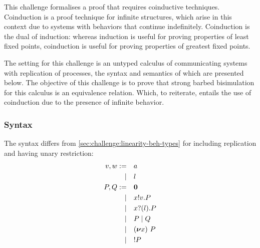 This challenge formalises a proof that requires coinductive techniques.
Coinduction is a proof technique for infinite structures, which arise in this context due to systems with behaviors that continue indefinitely.
Coinduction is the dual of induction: whereas induction is useful for proving properties of least fixed points, coinduction is useful for proving properties of greatest fixed points.

The setting for this challenge is an untyped calculus of communicating systems with replication of processes, the syntax and semantics of which are presented below.
The objective of this challenge is to prove that strong barbed bisimulation for this calculus is an equivalence relation. Which, to reiterate, entails the use of coinduction due to the presence of infinite behavior.

\subsubsection{Syntax}
The syntax differs from \ref{sec:challenge:linearity-beh-types} for including replication and having unary restriction:
\begin{align*}
  v,w :=&&& a \\
  |&&& l \\
  P,Q :=&&& \bm{0} \\
  |&&& x ! v . P \\
  |&&& x ? (l) . P \\
  |&&& P \mid Q \\
  |&&& (\bm{\nu} x)~P \\
  |&&& {!}P
\end{align*}
